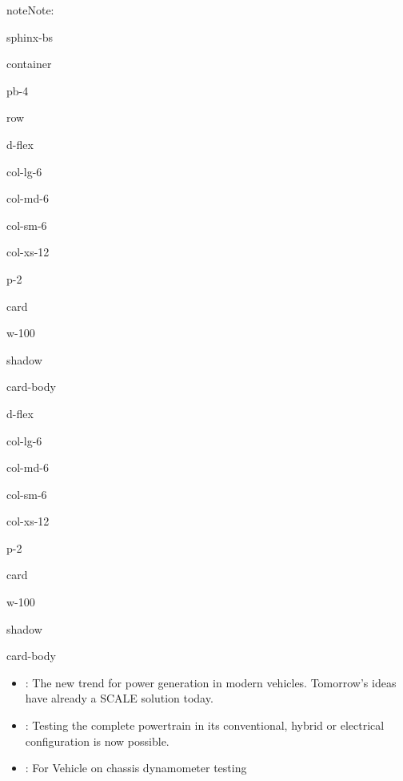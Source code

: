 \documentclass[letterpaper,10pt,english]{jupyterBook}
\begin{document}
\begin{sphinxadmonition}{note}{Note:}
\begin{sphinxuseclass}{sphinx-bs}
\begin{sphinxuseclass}{container}
\begin{sphinxuseclass}{pb-4}
\begin{sphinxuseclass}{row}
\begin{sphinxuseclass}{d-flex}
\begin{sphinxuseclass}{col-lg-6}
\begin{sphinxuseclass}{col-md-6}
\begin{sphinxuseclass}{col-sm-6}
\begin{sphinxuseclass}{col-xs-12}
\begin{sphinxuseclass}{p-2}
\begin{sphinxuseclass}{card}
\begin{sphinxuseclass}{w-100}
\begin{sphinxuseclass}{shadow}
\begin{sphinxuseclass}{card-body}
\end{sphinxuseclass}
\end{sphinxuseclass}
\end{sphinxuseclass}
\end{sphinxuseclass}
\end{sphinxuseclass}
\end{sphinxuseclass}
\end{sphinxuseclass}
\end{sphinxuseclass}
\end{sphinxuseclass}
\end{sphinxuseclass}
\begin{sphinxuseclass}{d-flex}
\begin{sphinxuseclass}{col-lg-6}
\begin{sphinxuseclass}{col-md-6}
\begin{sphinxuseclass}{col-sm-6}
\begin{sphinxuseclass}{col-xs-12}
\begin{sphinxuseclass}{p-2}
\begin{sphinxuseclass}{card}
\begin{sphinxuseclass}{w-100}
\begin{sphinxuseclass}{shadow}
\begin{sphinxuseclass}{card-body}\begin{itemize}
\item {} 
\sphinxAtStartPar
{} : The new trend for power generation in modern vehicles. Tomorrow’s ideas have already a SCALE solution today.

\item {} 
\sphinxAtStartPar
{} : Testing the complete powertrain in its conventional, hybrid or electrical configuration is now possible.

\item {} 
\sphinxAtStartPar
{} : For Vehicle on chassis dynamometer testing

\end{itemize}


\end{sphinxuseclass}
\end{sphinxuseclass}
\end{sphinxuseclass}
\end{sphinxuseclass}
\end{sphinxuseclass}
\end{sphinxuseclass}
\end{sphinxuseclass}
\end{sphinxuseclass}
\end{sphinxuseclass}
\end{sphinxuseclass}
\end{sphinxuseclass}
\end{sphinxuseclass}
\end{sphinxuseclass}
\end{sphinxuseclass}
\end{sphinxadmonition}
\end{document}
